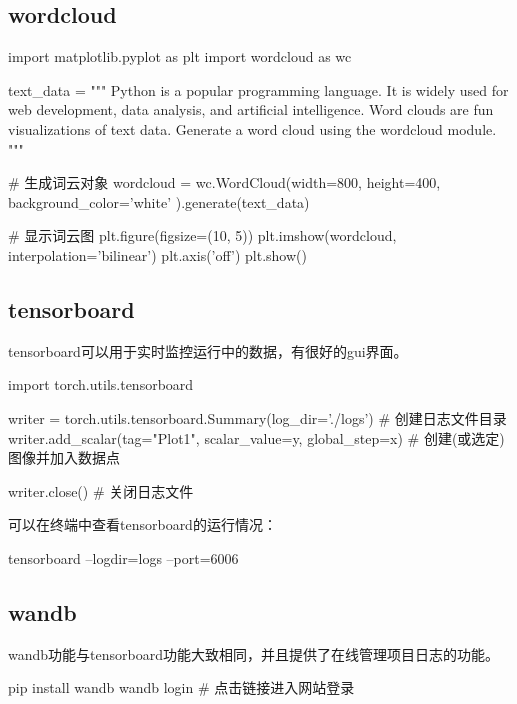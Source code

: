   \subsection{wordcloud}
    \begin{codeblock}[language=python, caption={wordcloud}]
      import matplotlib.pyplot as plt
      import wordcloud as wc

      text_data = """
      Python is a popular programming language.
      It is widely used for web development, data analysis, and artificial intelligence.
      Word clouds are fun visualizations of text data.
      Generate a word cloud using the wordcloud module.
      """

      # 生成词云对象
      wordcloud = wc.WordCloud(width=800, 
          height=400, 
          background_color='white'
          ).generate(text_data)

      # 显示词云图
      plt.figure(figsize=(10, 5))
      plt.imshow(wordcloud, interpolation='bilinear')
      plt.axis('off')
      plt.show()
    \end{codeblock}

  \subsection{tensorboard}
    tensorboard可以用于实时监控运行中的数据，有很好的gui界面。
    \begin{codeblock}[language=python, caption=tensorboard]
      import torch.utils.tensorboard

      writer = torch.utils.tensorboard.Summary(log_dir='./logs') # 创建日志文件目录
      writer.add_scalar(tag="Plot1", scalar_value=y, global_step=x) # 创建(或选定)图像并加入数据点

      writer.close() # 关闭日志文件
    \end{codeblock}

    可以在终端中查看tensorboard的运行情况：
    \begin{codeblock}[language={bash}, caption={tensorboard}]
      tensorboard --logdir=logs --port=6006
    \end{codeblock}

  \subsection{wandb}
    wandb功能与tensorboard功能大致相同，并且提供了在线管理项目日志的功能。
    \begin{codeblock}[language={bash}, caption={wandb login}]
      pip install wandb
      wandb login # 点击链接进入网站登录
    \end{codeblock}

